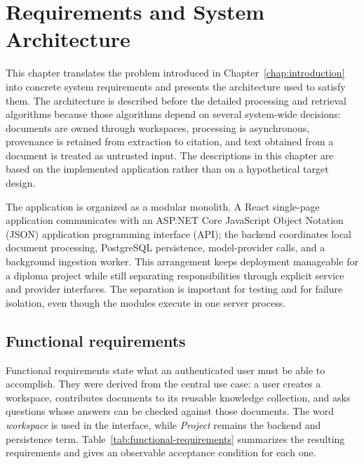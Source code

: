 \chapter[Requirements and System Architecture]{Requirements and System\\Architecture}
\label{chap:requirements-architecture}

This chapter translates the problem introduced in Chapter~\ref{chap:introduction} into concrete
system requirements and presents the architecture used to satisfy them. The
architecture is described before the detailed processing and retrieval
algorithms because those algorithms depend on several system-wide decisions:
documents are owned through workspaces, processing is asynchronous, provenance
is retained from extraction to citation, and text obtained from a document is
treated as untrusted input. The descriptions in this chapter are based on the
implemented application rather than on a hypothetical target design.

The application is organized as a modular monolith. A React single-page
application communicates with an ASP.NET Core JavaScript Object Notation
(JSON) application programming interface (API); the backend coordinates
local document processing, PostgreSQL persistence, model-provider calls, and a
background ingestion worker. This arrangement keeps deployment manageable for
a diploma project while still separating responsibilities through explicit
service and provider interfaces. The separation is important for testing and
for failure isolation, even though the modules execute in one server process.

\section{Functional requirements}
\label{sec:functional-requirements}

Functional requirements state what an authenticated user must be able to
accomplish. They were derived from the central use case: a user creates a
workspace, contributes documents to its reusable knowledge collection, and asks
questions whose answers can be checked against those documents. The word
\emph{workspace} is used in the interface, while \emph{Project} remains the
backend and persistence term. Table~\ref{tab:functional-requirements} summarizes
the resulting requirements and gives an observable acceptance condition for
each one.

